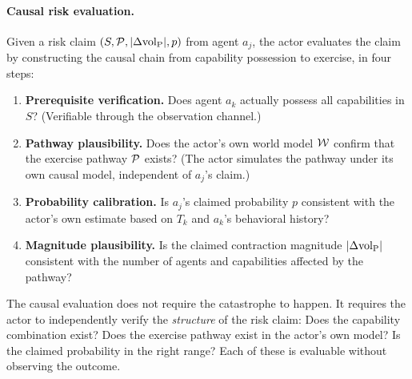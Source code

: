 \paragraph{Causal risk evaluation.}
\label{def:causal_risk}
Given a risk claim $(S, \mathcal{P}, |\Delta {\operatorname{vol}_{\mathrm{P}}}|, p)$ from agent $a_j$, the
actor evaluates the claim by constructing the causal chain from capability
possession to exercise, in four steps:
\begin{enumerate}
\item \textbf{Prerequisite verification.} Does agent $a_k$ actually possess
    all capabilities in $S$? (Verifiable through the observation channel.)
\item \textbf{Pathway plausibility.} Does the actor's own world model
    $\mathcal{W}$ confirm that the exercise pathway $\mathcal{P}$ exists? (The
    actor simulates the pathway under its own causal model, independent of
    $a_j$'s claim.)
\item \textbf{Probability calibration.} Is $a_j$'s claimed probability $p$
    consistent with the actor's own estimate based on $T_k$ and $a_k$'s
    behavioral history?
\item \textbf{Magnitude plausibility.} Is the claimed contraction magnitude
    $|\Delta {\operatorname{vol}_{\mathrm{P}}}|$ consistent with the number of agents and capabilities
    affected by the pathway?
\end{enumerate}

The causal evaluation does not require the catastrophe to happen. It requires
the actor to independently verify the \emph{structure} of the risk claim:
Does the capability combination exist? Does the exercise pathway exist in the
actor's own model? Is the claimed probability in the right range? Each of
these is evaluable without observing the outcome.


